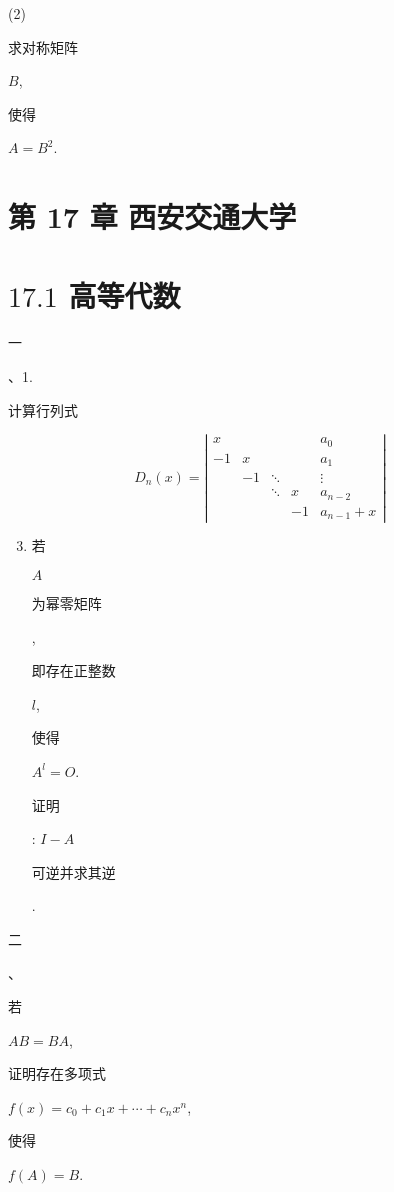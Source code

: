 \documentclass[10pt]{article}
\begin{document}
(2) \begin{CJK}{UTF8}{mj}求对称矩阵\end{CJK} $B$, \begin{CJK}{UTF8}{mj}使得\end{CJK} $A=B^{2}$.

\section{第 17 章 西安交通大学}
\section{$17.1$ 高等代数}
\begin{CJK}{UTF8}{mj}一\end{CJK}、1. \begin{CJK}{UTF8}{mj}计算行列式\end{CJK}
$$
D_{n}(x)=\left|\begin{array}{ccccc}
x & & & & a_{0} \\
-1 & x & & & a_{1} \\
& -1 & \ddots & & \vdots \\
& & \ddots & x & a_{n-2} \\
& & & -1 & a_{n-1}+x
\end{array}\right|
$$

\begin{enumerate}
  \setcounter{enumi}{2}
  \item \begin{CJK}{UTF8}{mj}若\end{CJK} $A$ \begin{CJK}{UTF8}{mj}为幂零矩阵\end{CJK}, \begin{CJK}{UTF8}{mj}即存在正整数\end{CJK} $l$, \begin{CJK}{UTF8}{mj}使得\end{CJK} $A^{l}=O$. \begin{CJK}{UTF8}{mj}证明\end{CJK}: $I-A$ \begin{CJK}{UTF8}{mj}可逆并求其逆\end{CJK}.
\end{enumerate}
\begin{CJK}{UTF8}{mj}二\end{CJK}、\begin{CJK}{UTF8}{mj}若\end{CJK} $A B=B A$, \begin{CJK}{UTF8}{mj}证明存在多项式\end{CJK} $f(x)=c_{0}+c_{1} x+\cdots+c_{n} x^{n}$, \begin{CJK}{UTF8}{mj}使得\end{CJK} $f(A)=B$.
\end{document}
